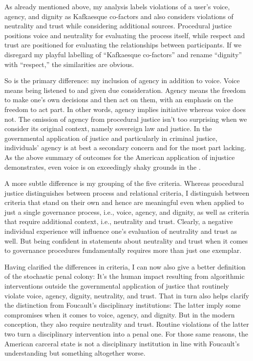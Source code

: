 As already mentioned above, my analysis labels violations of a user's voice,
agency, and dignity as Kafkaesque co-factors and also considers violations of
neutrality and trust while considering additional sources. Procedural justice
positions voice and neutrality for evaluating the process itself, while respect
and trust are positioned for evaluating the relationships between participants.
If we disregard my playful labelling of ``Kafkaesque co-factors'' and rename
``dignity'' with ``respect,'' the similarities are obvious.

So is the primary difference: my inclusion of agency in addition to voice. Voice
means being listened to and given due consideration. Agency means the freedom to
make one's own decisions and then act on them, with an emphasis on the freedom
to act part. In other words, agency implies initiative whereas voice does not.
The omission of agency from procedural justice isn't too surprising when we
consider its original context, namely sovereign law and justice. In the
governmental application of justice and particularly in criminal justice,
individuals' agency is at best a secondary concern and for the most part
lacking. As the above summary of outcomes for the American application of
injustice demonstrates, even voice is on exceedingly shaky grounds in the
.

A more subtle difference is my grouping of the five criteria. Whereas procedural
justice distinguishes between process and relational criteria, I distinguish
between criteria that stand on their own and hence are meaningful even when
applied to just a single governance process, i.e., voice, agency, and dignity,
as well as criteria that require additional context, i.e., neutrality and trust.
Clearly, a negative individual experience will influence one's evaluation of
neutrality and trust as well. But being confident in statements about neutrality
and trust when it comes to governance procedures fundamentally requires more
than just one exemplar.

Having clarified the differences in criteria, I can now also give a better
definition of the stochastic penal colony: It's the human impact resulting from
algorithmic interventions outside the governmental application of justice that
routinely violate voice, agency, dignity, neutrality, and trust. That in turn
also helps clarify the distinction from Foucault's disciplinary institutions:
The latter imply some compromises when it comes to voice, agency, and dignity.
But in the modern conception, they also require neutrality and trust. Routine
violations of the latter two turn a disciplinary intervention into a penal one.
For those same reasons, the American carceral state is not a disciplinary
institution in line with Foucault's understanding but something altogether
worse.
